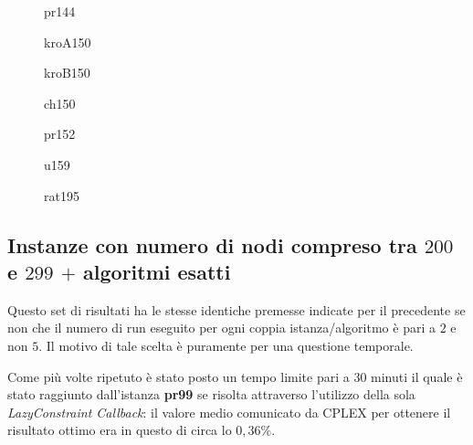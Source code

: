 \documentclass[11pt]{article}
\begin{document}
\begin{figure}[htbp]
\centering
{}
\label{fig:pr144}
\caption{pr144}
\end{figure}

\begin{figure}[htbp]
\centering
{}
\label{fig:kroA150}
\caption{kroA150}
\end{figure}

\begin{figure}[htbp]
\centering
{}
\label{fig:kroB150}
\caption{kroB150}
\end{figure}

\begin{figure}[htbp]
\centering
{}
\label{fig:ch150}
\caption{ch150}
\end{figure}

\begin{figure}[htbp]
\centering
{}
\label{fig:pr152}
\caption{pr152}
\end{figure}

\begin{figure}[htbp]
\centering
{}
\label{fig:u159}
\caption{u159}
\end{figure}

\begin{figure}[htbp]
\centering
{}
\label{fig:rat195}
\caption{rat195}
\end{figure}

\FloatBarrier

\subsection*{Instanze con numero di nodi compreso tra \textbf{$200$} e \textbf{$299$} $+$ algoritmi esatti}

Questo set di risultati ha le stesse identiche premesse indicate per il precedente se non che il numero di run eseguito per ogni coppia istanza/algoritmo è pari a $2$ e non $5$. Il motivo di tale scelta è puramente per una questione temporale.

Come più volte ripetuto è stato posto un tempo limite pari a $30$ minuti il quale è stato raggiunto dall'istanza \textbf{pr99} se risolta attraverso l'utilizzo della sola \textit{LazyConstraint Callback}: il valore medio comunicato da CPLEX per ottenere il risultato ottimo era in questo di circa lo $0,36\%$.
\end{document}
